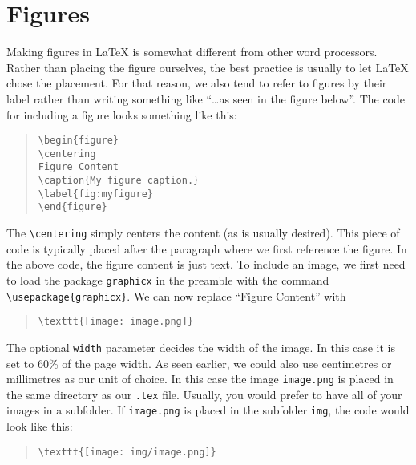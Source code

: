 \documentclass[a4paper,oneside]{memoir}
\begin{document}
\section{Figures}
Making figures in \LaTeX{} is somewhat different from other word processors. Rather than placing the figure ourselves, the best practice is usually to let \LaTeX{} chose the placement. For that reason, we also tend to refer to figures by their label rather than writing something like \enquote{\dots as seen in the figure below}. The code for including a figure looks something like this:

\begin{quote}
\begin{lstlisting}
\begin{figure}
\centering
Figure Content
\caption{My figure caption.}
\label{fig:myfigure}
\end{figure}
\end{lstlisting}
\end{quote}

The \texttt{\textbackslash centering} simply centers the content (as is usually desired). This piece of code is typically placed after the paragraph where we first reference the figure. In the above code, the figure content is just text. To include an image, we first need to load the package \texttt{graphicx} in the preamble with the command \lstinline$\usepackage{graphicx}$. We can now replace \enquote{Figure Content} with

\begin{quote}
\begin{lstlisting}
\texttt{[image: image.png]}
\end{lstlisting}
\end{quote}

The optional \texttt{width} parameter decides the width of the image. In this case it is set to 60\% of the page width. As seen earlier, we could also use centimetres or millimetres as our unit of choice. In this case the image \texttt{image.png} is placed in the same directory as our \texttt{.tex} file. Usually, you would prefer to have all of your images in a subfolder. If \texttt{image.png} is placed in the subfolder \texttt{img}, the code would look like this:

\begin{quote}
\begin{lstlisting}
\texttt{[image: img/image.png]}
\end{lstlisting}
\end{quote}
\end{document}
